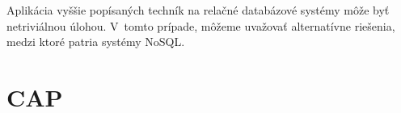 \documentclass[11pt,twoside,a4paper]{book}
\begin{document}
Aplikácia vyššie popísaných techník na relačné databázové systémy môže byť netriviálnou úlohou. V~tomto prípade, môžeme uvažovať alternatívne riešenia, medzi ktoré patria systémy NoSQL.





% 



\section{CAP}
\label{section:CAP}

\end{document}
